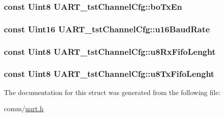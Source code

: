 \subsubsection[{bo\+Tx\+En}]{\setlength{\rightskip}{0pt plus 5cm}const {\bf Uint8} U\+A\+R\+T\+\_\+tst\+Channel\+Cfg\+::bo\+Tx\+En}\label{struct_u_a_r_t__tst_channel_cfg_a33e3153494fa6c826cbda1cbabf09f54}
\hypertarget{struct_u_a_r_t__tst_channel_cfg_a8456791055851cc12b1dcf57c8280f30}{}
\subsubsection[{u16\+Baud\+Rate}]{\setlength{\rightskip}{0pt plus 5cm}const {\bf Uint16} U\+A\+R\+T\+\_\+tst\+Channel\+Cfg\+::u16\+Baud\+Rate}\label{struct_u_a_r_t__tst_channel_cfg_a8456791055851cc12b1dcf57c8280f30}
\hypertarget{struct_u_a_r_t__tst_channel_cfg_a3b73fb6bcbb02156116c7d88257ca146}{}
\subsubsection[{u8\+Rx\+Fifo\+Lenght}]{\setlength{\rightskip}{0pt plus 5cm}const {\bf Uint8} U\+A\+R\+T\+\_\+tst\+Channel\+Cfg\+::u8\+Rx\+Fifo\+Lenght}\label{struct_u_a_r_t__tst_channel_cfg_a3b73fb6bcbb02156116c7d88257ca146}
\hypertarget{struct_u_a_r_t__tst_channel_cfg_ad762999dc9891a6d9b8a5e6d42da79ac}{}
\subsubsection[{u8\+Tx\+Fifo\+Lenght}]{\setlength{\rightskip}{0pt plus 5cm}const {\bf Uint8} U\+A\+R\+T\+\_\+tst\+Channel\+Cfg\+::u8\+Tx\+Fifo\+Lenght}\label{struct_u_a_r_t__tst_channel_cfg_ad762999dc9891a6d9b8a5e6d42da79ac}


The documentation for this struct was generated from the following file\+:\begin{DoxyCompactItemize}
\item 
comm/\hyperlink{uart_8h}{uart.\+h}\end{DoxyCompactItemize}
